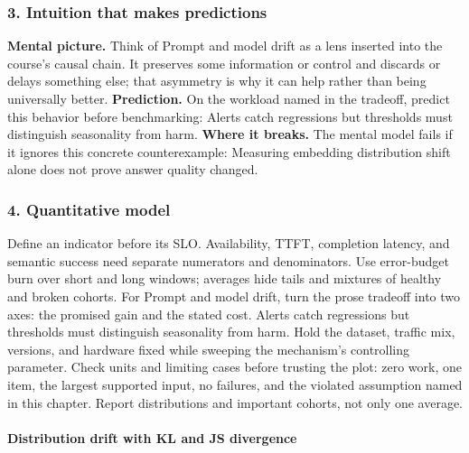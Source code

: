 \subsubsection*{3. Intuition that makes predictions}
\textbf{Mental picture.} Think of Prompt and model drift as a lens inserted into the course's causal chain. It preserves some information or control and discards or delays something else; that asymmetry is why it can help rather than being universally better.
\textbf{Prediction.} On the workload named in the tradeoff, predict this behavior before benchmarking: Alerts catch regressions but thresholds must distinguish seasonality from harm.
\textbf{Where it breaks.} The mental model fails if it ignores this concrete counterexample: Measuring embedding distribution shift alone does not prove answer quality changed.
\subsubsection*{4. Quantitative model}
Define an indicator before its SLO. Availability, TTFT, completion latency, and semantic success need separate numerators and denominators. Use error-budget burn over short and long windows; averages hide tails and mixtures of healthy and broken cohorts.
For Prompt and model drift, turn the prose tradeoff into two axes: the promised gain and the stated cost. Alerts catch regressions but thresholds must distinguish seasonality from harm. Hold the dataset, traffic mix, versions, and hardware fixed while sweeping the mechanism's controlling parameter.
Check units and limiting cases before trusting the plot: zero work, one item, the largest supported input, no failures, and the violated assumption named in this chapter. Report distributions and important cohorts, not only one average.
\paragraph{Distribution drift with KL and JS divergence}
